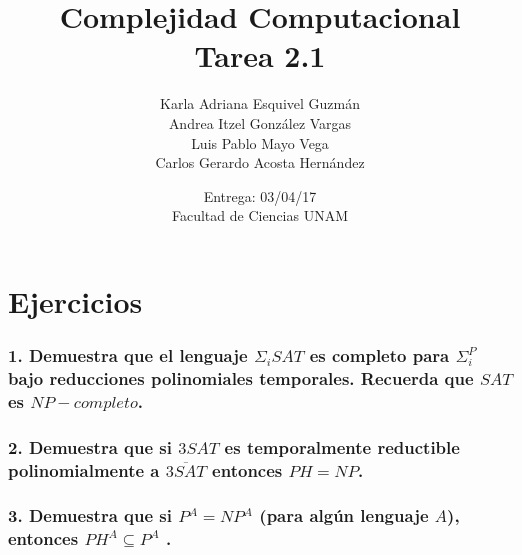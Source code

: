 \documentclass[12pt]{article}
\title{Complejidad Computacional \\ Tarea 2.1}
\author{Karla Adriana Esquivel Guzmán \\ Andrea Itzel González Vargas\\ Luis Pablo Mayo Vega \\ Carlos Gerardo Acosta Hernández}
\date{Entrega: 03/04/17 \\ Facultad de Ciencias UNAM}
\begin{document}
\maketitle
\section*{Ejercicios}
\subsubsection*{1. Demuestra que el lenguaje $\Sigma_iSAT$ es completo para $\Sigma^P_i$ bajo reducciones polinomiales
temporales. Recuerda que $SAT$ es $NP-completo$.}
\subsubsection*{2. Demuestra que si $3SAT$ es temporalmente reductible polinomialmente a $\overline{3SAT}$ entonces $PH = NP$.}
\subsubsection*{3. Demuestra que si $P^A = NP^A$ (para algún lenguaje $A$), entonces $PH^A \subseteq P^A$ .}
\end{document}

